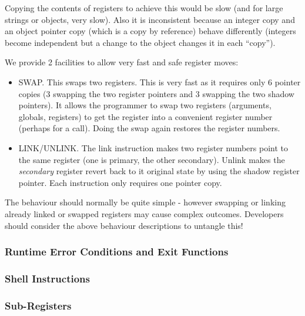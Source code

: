 Copying the contents of registers to achieve this would be slow (and for
large strings or objects, very slow). Also it is inconsistent because an
integer copy and an object pointer copy (which is a copy by reference)
behave differently (integers become independent but a change to the
object changes it in each ``copy'').

We provide 2 facilities to allow very fast and safe register moves:

\begin{itemize}
\item
  SWAP. This swaps two registers. This is very fast as it requires only
  6 pointer copies (3 swapping the two register pointers and 3 swapping
  the two shadow pointers). It allows the programmer to swap two
  registers (arguments, globals, registers) to get the register into a
  convenient register number (perhaps for a call). Doing the swap again
  restores the register numbers.
\item
  LINK/UNLINK. The link instruction makes two register numbers point to
  the same register (one is primary, the other secondary). Unlink makes
  the \emph{secondary} register revert back to it original state by
  using the shadow register pointer. Each instruction only requires one
  pointer copy.
\end{itemize}

The behaviour should normally be quite simple - however swapping or
linking already linked or swapped registers may cause complex outcomes.
Developers should consider the above behaviour descriptions to untangle
this!

\hypertarget{runtime-error-conditions-and-exit-functions}{%
\subsubsection{Runtime Error Conditions and Exit
Functions}\label{runtime-error-conditions-and-exit-functions}}

\hypertarget{shell-instructions}{%
\subsubsection{Shell Instructions}\label{shell-instructions}}

\hypertarget{sub-registers}{%
\subsubsection{Sub-Registers}\label{sub-registers}}

